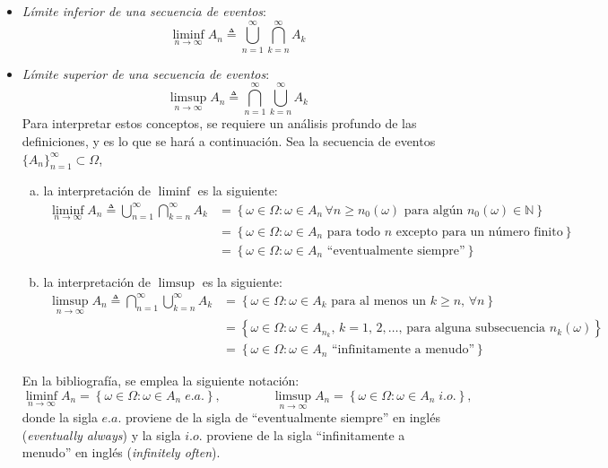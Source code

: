 \documentclass[a4paper]{report}
\begin{document}
\begin{itemize}
 \item \emph{Límite inferior de una secuencia de eventos}: 
 \[
  \liminf_{n\rightarrow \infty }A_n\triangleq\bigcup_{n=1}^{\infty }\bigcap_{k=n}^{\infty }A_k
 \]
\item \emph{Límite superior de una secuencia de eventos}: 
 \[
  \limsup_{n\rightarrow \infty }A_n\triangleq\bigcap_{n=1}^{\infty }\bigcup_{k=n}^{\infty }A_k
 \]
Para interpretar estos conceptos, se requiere un análisis profundo de las definiciones, y es lo que se hará a continuación. Sea la secuencia de eventos \(\{A_n\}_{n=1}^{\infty}\subset\Omega\),
\begin{enumerate}[(a)]
 \item la interpretación de \(\liminf\) es la siguiente:
 \begin{align*}
  \liminf_{n\rightarrow \infty }A_n\triangleq\bigcup_{n=1}^{\infty }\bigcap_{k=n}^{\infty }A_k&=\left\{\omega\in\Omega:\omega\in A_n\,\forall n\geq n_0(\omega)\textrm{ para algún }n_0(\omega)\in\mathbb{N}\right\}\\
  &=\left\{\omega\in\Omega:\omega\in A_n \textrm{ para todo }n\textrm{ excepto para un número finito}\right\}\\
  &=\left\{\omega\in\Omega:\omega\in A_n \textrm{ ``eventualmente siempre''}\right\}
 \end{align*}
 \item la interpretación de \(\limsup\) es la siguiente:
 \begin{align*}
  \limsup_{n\rightarrow \infty }A_n\triangleq\bigcap_{n=1}^{\infty }\bigcup_{k=n}^{\infty }A_k&=\left\{\omega\in\Omega:\omega\in A_k\textrm{ para al menos un }k\geq n,\,\forall n\right\}\\
  &=\left\{\omega\in\Omega:\omega\in A_{n_k},\, k=1,\,2,\dots,\,\textrm{para alguna subsecuencia } n_k(\omega)\right\}\\
  &=\left\{\omega\in\Omega:\omega\in A_n \textrm{ ``infinitamente a menudo''}\right\}
 \end{align*}
\end{enumerate}
En la bibliografía, se emplea la siguiente notación:
\[
 \liminf_{n\rightarrow \infty }A_n=\left\{\omega\in\Omega:\omega\in A_n\;e.a.\right\},\qquad\qquad
 \limsup_{n\rightarrow \infty }A_n=\left\{\omega\in\Omega:\omega\in A_n\;i.o.\right\},
\]
donde la sigla \(e.a.\) proviene de la sigla de ``eventualmente siempre'' en inglés (\emph{eventually always}) y la sigla \(i.o.\) proviene de la sigla ``infinitamente a menudo'' en inglés (\emph{infinitely often}).


\end{itemize}
\end{document}
